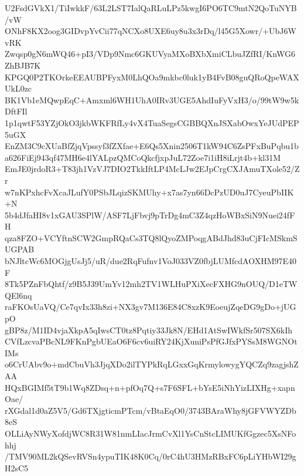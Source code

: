 U2FsdGVkX1/TiIwkkF/63L2LST7IalQaRLuLPz5kwgI6PO6TC9mtN2QoTuNYB/vW
ONhF8KX2oog3GIDvpYvCii77qNCXo8UXE6uy8u3x3rDq/l45G5Xowr/+UbJ6WvRK
Zwqsp0gN6mWQ46+pI3/VDp9Nmc6GKUVyaMXoBXbXmiCLbuJZfRI/KnWG6ZhBJB7K
KPGQ0P2TKOrkeEEAUBPFyxM0LhQOa9mkbc0luk1yB4FvB08guQRoQpeWAXUkL0zc
BK1Vb1eMQwpEqC+Amxml6WH1UhA0IRv3UGE5AhdIuFyVxH3/o/99tW9w5kDftFIl
1p1qwtF53YZjOkO3jkbWKFRfLy4vX4TuaSegsCGBBQXnJSXabOwxYeJUdPEP5uGX
EnZM3C9cXUaBfZjqVpssyf3fZXfae+E6Qs5Xnin2506T1kW94C6ZsPFxBuPqbu1b
a626FiEj943qf47MH6e4lYALpzQMCoQkcfjxpJuL72Zoe7i1iH8iLrjt4b+kl31M
EmJE0jrdoR3+T83jh1VzVJ7DIO2TkkIftLP4McLJw2EJpCrgCXJAmuTXole52/Zr
w7nKPxhcFvXcaJLufY0PSbJLqizSKMUhy+x7as7yn66DcPzUD0uJ7CyeuPbIIK+N
5b4dJfaHI8v1xGAU3SPlW/ASF7LjFbvj9pTrDg4mC3Z4qzHoWBxSiN9Nuei24fFH
qza8FZO+VCYftnSCW2GmpRQaCs3TQ8lQyoZMPoqgABdJhd83uCjFIcMSkmSUGPAB
bNJltcWc6MOGjgUsJj5/uR/due2RqFufnv1VoJ033VZ0fbjLUMfcdAOXHM97E40F
8Tk5PZnFbQhtf/z9B5J39UmYv12mh2TV1WLHuPXiXecFXHG9nOUQ/D1eTWQEl6nq
raFKOsUaVQ/Ce7qvIx33h8zi+NX3gv7M136E84C8xzK9EoeujZqeDG9gDo+jUGpO
gBP8z/M1ID4vjaXkpA5qIwsCT0tz8Pqtiy33Jk8N/EHd1AtSwIWkfSr507SX6kIh
CVfLzcvaPBcNL9FKnPgbUEaO6F6cv6uiRY24KjXuniPsPfGJfxPYSsM8WGNOtIMs
o6CrUAbv9o+mdCbuVh3JjqXDo2ilTYPkRqLGxxGqKrmylowygYQCZq9zagjshZAA
HQxBGIMf5tT9b1Wq8ZDsq+n+pfOq7Q+s7F6SFL+bYsE5iNhYizLIXHg+xapnOae/
rXGdal1d0aZ5V5/Gd6TXjgticmPTcm/vBtaEqO0/3743BAraWhy8jGFVWYZDb8eS
OLLiAyNWyXofdjWC8R31W81nmLIacJrmCvXl1YsCnStcLIMUKfGgzec5XsNFohhj
/TMV90ML2kQSevRVSn4ypuTIK48K0Cq/0rC4hU3HMzRBxFC6pLiYHbWI29gH2sC5
